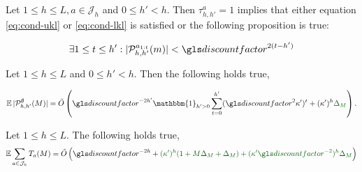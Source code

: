\begin{lemma}
	\label{lemma:size_Ph}
	\begin{leftbar}[lemmabar]
	Let $1 \leq h \leq L,  a\in \mathcal{J}_h$ and $0\leq h'<h$. Then $\tau^a_{h,h'}=1$ implies that either equation \eqref{eq:cond-ukl} or \eqref{eq:cond-lkl} is satisfied or the following proposition is true:
	
	
	\begin{equation}
	\label{eq:P-min-size}
	\exists 1\leq t \leq h': |\mathcal{P}_{h,h'}^{a_{1:t}}(m)| < \discount^{2(t-h')}
	\end{equation}
	\end{leftbar}
\end{lemma}

\begin{lemma}
	\label{lemma:expected-P-size}
    \begin{leftbar}[lemmabar]
	Let $1\leq h\leq L$ and $0 \leq h' < h$. Then the following holds true,
	
	\begin{equation*}
	\expectedvalue |\mathcal{P}^\emptyset_{h,h'}(M)| = \tilde{O}\left(\discount^{-2h'}\mathbbm{1}_{h'>0}\sum_{t=0}^{h'}(\discount^2 \kappa')^t + (\kappa')^h\diff{\Delta_M} \right).
	\end{equation*}
	\end{leftbar}
\end{lemma}

\begin{lemma}
	\label{lemma:expected-plays-count}
	\begin{leftbar}[lemmabar]
	Let $1\leq h\leq L$. The following holds true,
	\begin{equation*}
	\expectedvalue \sum_{a\in \mathcal{J}_h} T_a(M) = \tilde{O}\left(\discount^{-2h} + \diff{(\kappa')^h(1+M\Delta_M+\Delta_M) + (\kappa'\discount^{-2})^h\Delta_M}\right)
	\end{equation*}
	\end{leftbar}
\end{lemma}

